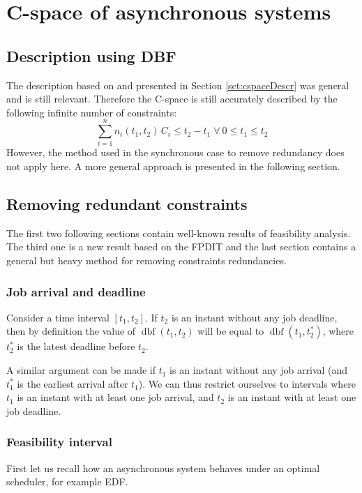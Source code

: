 \documentclass[conference]{IEEEtran}
\newcommand{\dbf}[1]{\operatorname{dbf}(#1)}
\begin{document}
\section{C-space of asynchronous systems}
\label{sct:asyncCspace}

	\subsection{Description using DBF}

		The description based on \cite{baruah1999generalized} and presented in Section \ref{sct:cspaceDescr} was general and
		is still relevant. Therefore the C-space is still accurately described by
		the following infinite number of constraints:
		\begin{equation}
			\sum_{i=1}^{n} n_i(t_1, t_2)
			\, C_i \leq t_2 - t_1 \; \forall \: 0 \leq t_1 \leq t_2
		\end{equation}
		However, the method used in the synchronous case to remove redundancy does not
		apply here. A more general approach is presented in the following section.

	\subsection{Removing redundant constraints}

		The first two following sections contain well-known results of feasibility analysis.
		The third one is a new result based on the FPDIT and the last section contains a general
		but heavy method for removing constraints redundancies.

		\subsubsection{Job arrival and deadline}
			Consider a time interval $[t_1, t_2]$. If $t_2$ is an instant without any
			job deadline, then by definition the value of $\dbf{t_1, t_2}$ will be equal to
			$\dbf{t_1, t_2^*}$, where $t_2^*$ is the latest deadline before $t_2$.

			A similar argument can be made if $t_1$ is an instant without any job arrival
			(and $t_1^*$ is the earliest arrival after $t_1$). We can thus restrict
			ourselves to intervals where $t_1$ is an instant with at least one job
			arrival, and $t_2$ is an instant with at least one job deadline.

		\subsubsection{Feasibility interval}
			First let us recall how an asynchronous system behaves under an optimal
			scheduler, for example EDF.
\end{document}
